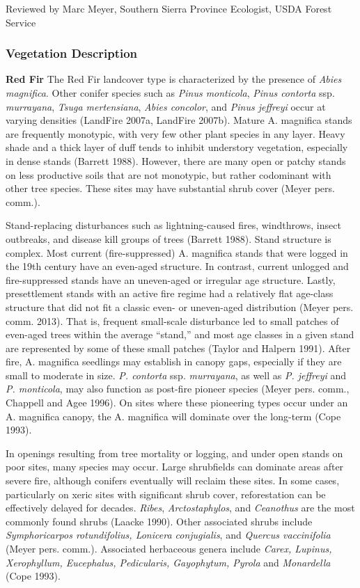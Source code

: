 \noindent Reviewed by Marc Meyer, Southern Sierra Province Ecologist, USDA Forest Service

\subsubsection{Vegetation Description}
\textbf{Red Fir} The Red Fir landcover type is characterized by the presence of \emph{Abies magnifica}. Other conifer species such as \emph{Pinus monticola}, \emph{Pinus contorta} ssp. \emph{murrayana}, \emph{Tsuga mertensiana}, \emph{Abies concolor}, and \emph{Pinus jeffreyi} occur at varying densities (LandFire 2007a, LandFire 2007b). Mature A. magnifica stands are frequently monotypic, with very few other plant species in any layer. Heavy shade and a thick layer of duff tends to inhibit understory vegetation, especially in dense stands (Barrett 1988). However, there are many open or patchy stands on less productive soils that are not monotypic, but rather codominant with other tree species. These sites may have substantial shrub cover (Meyer pers. comm.).

Stand-replacing disturbances such as lightning-caused fires, windthrows, insect outbreaks, and disease kill groups of trees (Barrett 1988). Stand structure is complex. Most current (fire-suppressed) A. magnifica stands that were logged in the 19th century have an even-aged structure. In contrast, current unlogged and fire-suppressed stands have an uneven-aged or irregular age structure. Lastly, presettlement stands with an active fire regime had a relatively flat age-class structure that did not fit a classic even- or uneven-aged distribution (Meyer pers. comm. 2013). That is, frequent small-scale disturbance led to small patches of even-aged trees within the average ``stand,'' and most age classes in a given stand are represented by some of these small patches (Taylor and Halpern 1991). After fire, A. magnifica seedlings may establish in canopy gaps, especially if they are small to moderate in size. \emph{P. contorta} ssp. \emph{murrayana}, as well as \emph{P. jeffreyi} and \emph{P. monticola}, may also function as post-fire pioneer species (Meyer pers. comm., Chappell and Agee 1996). On sites where these pioneering types occur under an A. magnifica canopy, the A. magnifica will dominate over the long-term (Cope 1993).

In openings resulting from tree mortality or logging, and under open stands on poor sites, many species may occur. Large shrubfields can dominate areas after severe fire, although conifers eventually will reclaim these sites. In some cases, particularly on xeric sites with significant shrub cover, reforestation can be effectively delayed for decades. \emph{Ribes}, \emph{Arctostaphylos}, and \emph{Ceanothus} are the most commonly found shrubs (Laacke 1990). Other associated shrubs include \emph{Symphoricarpos rotundifolius, Lonicera conjugialis}, and \emph{Quercus vaccinifolia} (Meyer pers. comm.). Associated herbaceous genera include \emph{Carex, Lupinus, Xerophyllum, Eucephalus, Pedicularis, Gayophytum, Pyrola} and \emph{Monardella} (Cope 1993).




